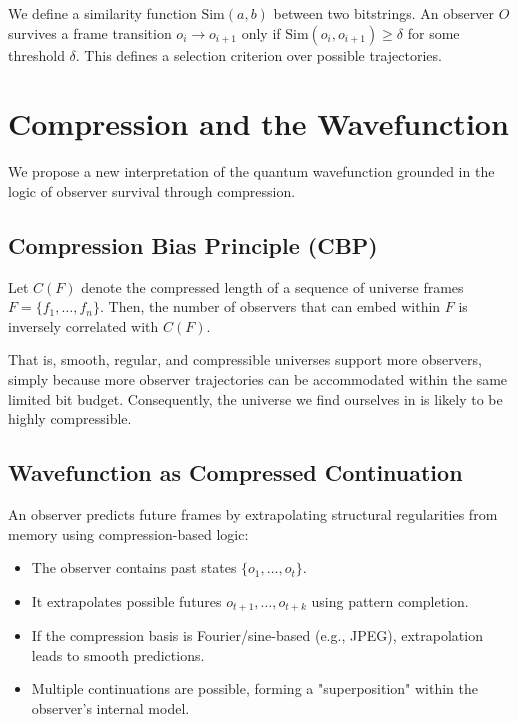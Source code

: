\documentclass[12pt]{article}
\begin{document}
We define a similarity function $\text{Sim}(a, b)$ between two bitstrings. An observer $O$ survives a frame transition $o_i \to o_{i+1}$ only if $\text{Sim}(o_i, o_{i+1}) \ge \delta$ for some threshold $\delta$. This defines a selection criterion over possible trajectories.

\section{Compression and the Wavefunction}

We propose a new interpretation of the quantum wavefunction grounded in the logic of observer survival through compression.

\subsection{Compression Bias Principle (CBP)}

Let $C(F)$ denote the compressed length of a sequence of universe frames $F = \{f_1, \ldots, f_n\}$. Then, the number of observers that can embed within $F$ is inversely correlated with $C(F)$.

That is, smooth, regular, and compressible universes support more observers, simply because more observer trajectories can be accommodated within the same limited bit budget. Consequently, the universe we find ourselves in is likely to be highly compressible.

\subsection{Wavefunction as Compressed Continuation}

An observer predicts future frames by extrapolating structural regularities from memory using compression-based logic:

\begin{itemize}
    \item The observer contains past states $\{o_1, \ldots, o_t\}$.
    \item It extrapolates possible futures $o_{t+1}, \ldots, o_{t+k}$ using pattern completion.
    \item If the compression basis is Fourier/sine-based (e.g., JPEG), extrapolation leads to smooth predictions.
    \item Multiple continuations are possible, forming a "superposition" within the observer's internal model.
\end{itemize}
\end{document}
